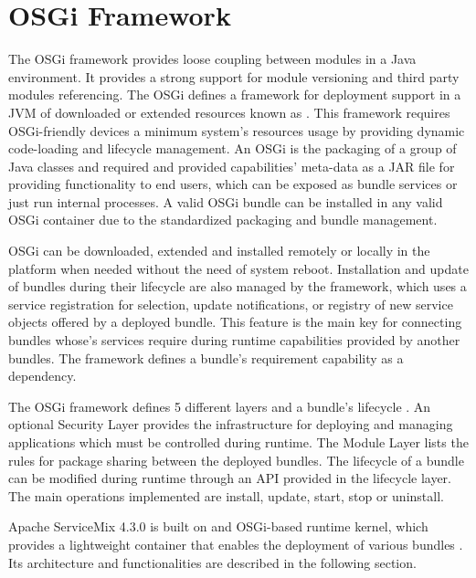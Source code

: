 \section{OSGi Framework}
\label{sec:osgi}

The \ac{OSGi} framework provides loose coupling between modules in a Java environment. It provides a strong support for module versioning and third party modules referencing. The \ac{OSGi} defines a framework for deployment support in a \ac{JVM} of downloaded or extended resources known as . This framework requires OSGi-friendly devices a minimum system's resources usage by providing dynamic code-loading and  lifecycle management. An \ac{OSGi}  is the packaging of a group of Java classes and required and provided capabilities' meta-data as a JAR file for providing functionality to end users, which can be exposed as bundle services or just run internal processes. A valid \ac{OSGi} bundle can be installed in any valid \ac{OSGi} container due to the standardized packaging and bundle management. 

\ac{OSGi}  can be downloaded, extended and installed remotely or locally in the platform when needed without the need of system reboot. Installation and update of bundles during their lifecycle are also managed by the framework, which uses a service registration for selection, update notifications, or registry of new service objects offered by a deployed bundle. This feature is the main key for connecting bundles whose's services require during runtime capabilities provided by another bundles. The framework defines a bundle's requirement capability as a dependency.      

The \ac{OSGi} framework defines 5 different layers and a bundle's lifecycle \cite{OSGi2011}. An optional Security Layer provides the infrastructure for deploying and managing applications which must be controlled during runtime. The Module Layer lists the rules for package sharing between the deployed bundles. The lifecycle of a bundle can be modified during runtime through an API provided in the lifecycle layer. The main operations implemented are install, update, start, stop or uninstall. 

Apache ServiceMix 4.3.0 is built on and \ac{OSGi}-based runtime kernel, which provides a lightweight container that enables the deployment of various bundles \cite{openesbaction}. Its architecture and functionalities are described in the following section. 
